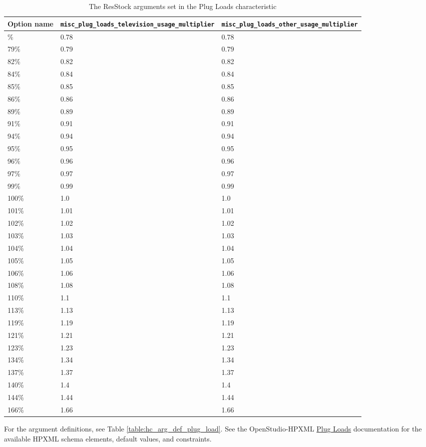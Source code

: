 \begin{longtable}[] {|p{3.5cm}|p{2.5cm}|p{2.5cm}|}\caption{The ResStock arguments set in the Plug Loads characteristic} \label{table:hc_opt_plug_load}  \\
\toprule\noalign{}
Option name &
\texttt{misc\_plug\_loads\_television\_usage\_multiplier} &
\texttt{misc\_plug\_loads\_other\_usage\_multiplier} \\
\midrule\noalign{}
\endhead
\bottomrule\noalign{}
\endlastfoot
78\% & 0.78 &  0.78 \\
79\% & 0.79 & 0.79 \\
82\% & 0.82 & 0.82 \\
84\% & 0.84  & 0.84 \\
85\% & 0.85 &  0.85 \\
86\% & 0.86 & 0.86 \\
89\% & 0.89 & 0.89 \\
91\% & 0.91 &0.91 \\
94\% & 0.94 &  0.94 \\
95\% & 0.95 & 0.95 \\
96\% & 0.96 & 0.96 \\
97\% & 0.97 &  0.97 \\
99\% & 0.99 &0.99 \\
100\% & 1.0 &  1.0 \\
101\% & 1.01 & 1.01 \\
102\% & 1.02 &1.02 \\
103\% & 1.03 &  1.03 \\
104\% & 1.04 & 1.04 \\
105\% & 1.05 &1.05 \\
106\% & 1.06 & 1.06 \\
108\% & 1.08 & 1.08 \\
110\% & 1.1 & 1.1 \\
113\% & 1.13 & 1.13 \\
119\% & 1.19 & 1.19 \\
121\% & 1.21 & 1.21 \\
123\% & 1.23 & 1.23 \\
134\% & 1.34 & 1.34 \\
137\% & 1.37 &  1.37 \\
140\% & 1.4 & 1.4 \\
144\% & 1.44 & 1.44 \\
166\% & 1.66 &  1.66 \\
\end{longtable}

For the argument definitions, see Table \ref{table:hc_arg_def_plug_load}. See the OpenStudio-HPXML \href{https://openstudio-hpxml.readthedocs.io/en/v1.8.1/workflow_inputs.html#hpxml-plug-loads}{Plug Loads} documentation for the available HPXML schema elements, default values, and constraints.

